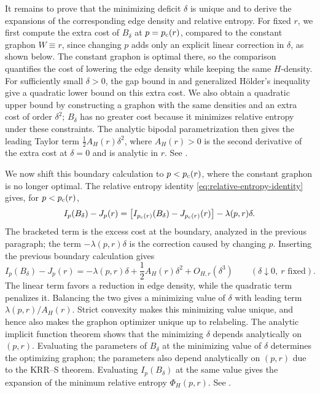 \begin{enumerate}[label=(\roman*),leftmargin=2.2em]
It remains to prove that the minimizing deficit $\delta$ is unique and to
derive the expansions of the corresponding edge density and relative entropy.
For fixed $r$, we first compute the extra cost of $B_\delta$ at $p=p_{\mathrm c}(r)$,
compared to the constant graphon $W\equiv r$,
since changing $p$ adds only an explicit linear correction in $\delta$, as shown below.
The constant graphon is optimal there, so the comparison quantifies
the cost of lowering the edge density while keeping the same $H$-density.
For sufficiently small $\delta>0$, the gap bound in  and generalized
H\"older's inequality give a quadratic lower bound on this extra cost.
We also obtain a quadratic upper bound by constructing a graphon with
the same densities and an extra cost of order $\delta^2$; $B_\delta$ has no
greater cost because it minimizes relative entropy under these constraints.
The analytic bipodal parametrization then gives the leading Taylor term
$\frac12A_H(r)\delta^2$, where $A_H(r)>0$ is the second derivative of the
extra cost at $\delta=0$ and is analytic in $r$.
See .

We now shift this boundary calculation to $p<p_{\mathrm c}(r)$, where the constant graphon is no longer optimal.
The relative entropy identity \eqref{eq:relative-entropy-identity} gives, for $p<p_{\mathrm c}(r)$,
\[
  I_p(B_\delta)-J_p(r)
  =\bigl[I_{p_{\mathrm c}(r)}(B_\delta)-J_{p_{\mathrm c}(r)}(r)\bigr]
   -\lambda(p,r)\delta.
\]
The bracketed term is the excess cost at the boundary, analyzed in the
previous paragraph; the term $-\lambda(p,r)\delta$ is the correction
caused by changing $p$.  Inserting the previous boundary calculation gives
\[
  I_p(B_\delta)-J_p(r)
  =-\lambda(p,r)\delta+\frac12A_H(r)\delta^2+O_{H,r}(\delta^3)
  \qquad(\delta\downarrow0,\ r\text{ fixed}).
\]
The linear term favors a reduction in edge density, while the quadratic
term penalizes it.  Balancing the two gives a minimizing value of $\delta$
with leading term $\lambda(p,r)/A_H(r)$.  Strict convexity makes this
minimizing value unique, and hence also makes the graphon optimizer unique
up to relabeling.  The analytic implicit function theorem shows that the
minimizing $\delta$ depends analytically on $(p,r)$.  Evaluating the
parameters of $B_\delta$ at the minimizing value of $\delta$ determines
the optimizing graphon; the parameters also depend analytically on $(p,r)$
due to the KRR--S theorem.  Evaluating $I_p(B_\delta)$ at the same value
gives the expansion of the minimum relative entropy $\Phi_H(p,r)$.
See .


\end{enumerate}
